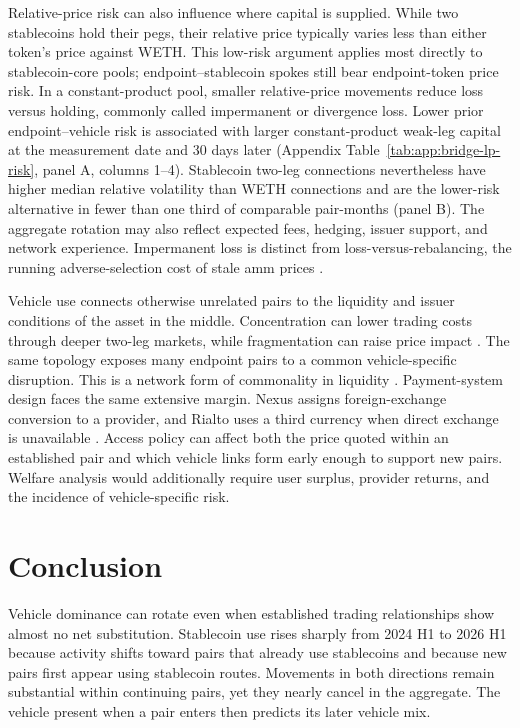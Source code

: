 Relative-price risk can also influence where capital is supplied. While two stablecoins hold their pegs, their relative price typically varies less than either token's price against WETH. This low-risk argument applies most directly to stablecoin-core pools; endpoint--stablecoin spokes still bear endpoint-token price risk. In a constant-product pool, smaller relative-price movements reduce loss versus holding, commonly called impermanent or divergence loss. Lower prior endpoint--vehicle risk is associated with larger constant-product weak-leg capital at the measurement date and 30 days later (Appendix Table~\ref{tab:app:bridge-lp-risk}, panel A, columns 1--4). Stablecoin two-leg connections nevertheless have higher median relative volatility than WETH connections and are the lower-risk alternative in fewer than one third of comparable pair-months (panel B). The aggregate rotation may also reflect expected fees, hedging, issuer support, and network experience. Impermanent loss is distinct from loss-versus-rebalancing, the running adverse-selection cost of stale \ac{amm} prices \citep{MilionisMoallemiRoughgardenZhang2022LVR}.

Vehicle use connects otherwise unrelated pairs to the liquidity and issuer conditions of the asset in the middle. Concentration can lower trading costs through deeper two-leg markets, while fragmentation can raise price impact \citep{ChenDuffie2021Fragmentation}. The same topology exposes many endpoint pairs to a common vehicle-specific disruption. This is a network form of commonality in liquidity \citep{ChordiaRollSubrahmanyam2000Commonality}. Payment-system design faces the same extensive margin. Nexus assigns foreign-exchange conversion to a provider, and Rialto uses a third currency when direct exchange is unavailable \citep{BISNexusFX2024,BISRialto2025}. Access policy can affect both the price quoted within an established pair and which vehicle links form early enough to support new pairs. Welfare analysis would additionally require user surplus, provider returns, and the incidence of vehicle-specific risk.

\section{Conclusion}
\label{sec:conclusion}

Vehicle dominance can rotate even when established trading relationships show almost no net substitution. Stablecoin use rises sharply from 2024 H1 to 2026 H1 because activity shifts toward pairs that already use stablecoins and because new pairs first appear using stablecoin routes. Movements in both directions remain substantial within continuing pairs, yet they nearly cancel in the aggregate. The vehicle present when a pair enters then predicts its later vehicle mix.


